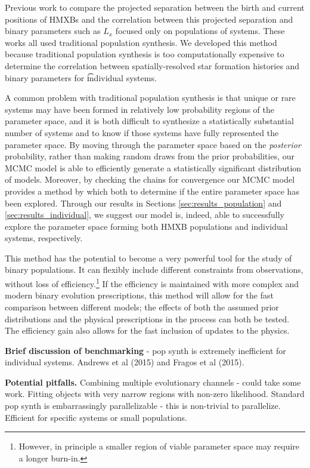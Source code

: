 \documentclass[12pt, preprint]{aastex}
\begin{document}
Previous work to compare the projected separation between the birth and current positions of HMXBs \citet{sepinsky05} and the correlation between this projected separation and binary parameters such as $L_x$ \citet{zuo10,zuo15} focused only on populations of systems. These works all used traditional population synthesis. We developed this method because traditional population synthesis is too computationally expensive to determine the correlation between spatially-resolved star formation histories and binary parameters for {\t individual} systems.

A common problem with traditional population synthesis is that unique or rare systems may have been formed in relatively low probability regions of the parameter space, and it is both difficult to synthesize a statistically substantial number of systems and to know if those systems have fully represented the parameter space. By moving through the parameter space based on the {\it posterior} probability, rather than making random draws from the prior probabilities, our MCMC model is able to efficiently generate a statistically significant distribution of models. Moreover, by checking the chains for convergence our MCMC model provides a method by which both to determine if the entire parameter space has been explored. Through our results in Sections \ref{sec:results_population} and \ref{sec:results_individual}, we suggest our model is, indeed, able to successfully explore the parameter space forming both HMXB populations and individual systems, respectively.

This method has the potential to become a very powerful tool for the study of binary populations. It can flexibly include different constraints from observations, without loss of efficiency.\footnote{However, in principle a smaller region of viable parameter space may require a longer burn-in.} If the efficiency is maintained with more complex and modern binary evolution prescriptions, this method will allow for the fast comparison between different models; the effects of both the assumed prior distributions and the physical prescriptions in the process can both be tested. The efficiency gain also allows for the fast inclusion of updates to the physics.


{\bf Brief discussion of benchmarking} - pop synth is extremely inefficient for individual systems. Andrews et al (2015) and Fragos et al (2015).


{\bf Potential pitfalls.} Combining multiple evolutionary channels - could take some work. Fitting objects with very narrow regions with non-zero likelihood. Standard pop synth is embarrassingly parallelizable - this is non-trivial to parallelize. Efficient for specific systems or small populations.
\end{document}
